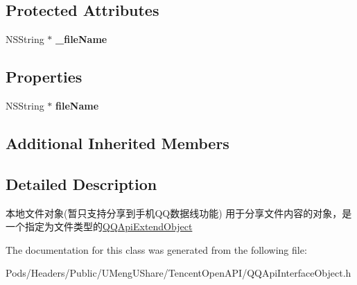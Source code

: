 \subsection*{Protected Attributes}
\begin{DoxyCompactItemize}
\item 
\mbox{\label{interface_q_q_api_file_object_a967668e1cff9c2bc40e1755f17c24d3e}} 
N\+S\+String $\ast$ {\bfseries \+\_\+file\+Name}
\end{DoxyCompactItemize}
\subsection*{Properties}
\begin{DoxyCompactItemize}
\item 
\mbox{\label{interface_q_q_api_file_object_a985992d0792136a8601253ba2e352bf5}} 
N\+S\+String $\ast$ {\bfseries file\+Name}
\end{DoxyCompactItemize}
\subsection*{Additional Inherited Members}


\subsection{Detailed Description}
本地文件对象(暂只支持分享到手机\+Q\+Q数据线功能) 用于分享文件内容的对象，是一个指定为文件类型的{\ttfamily \mbox{\hyperlink{interface_q_q_api_extend_object}{Q\+Q\+Api\+Extend\+Object}}} 

The documentation for this class was generated from the following file\+:\begin{DoxyCompactItemize}
\item 
Pods/\+Headers/\+Public/\+U\+Meng\+U\+Share/\+Tencent\+Open\+A\+P\+I/Q\+Q\+Api\+Interface\+Object.\+h\end{DoxyCompactItemize}
